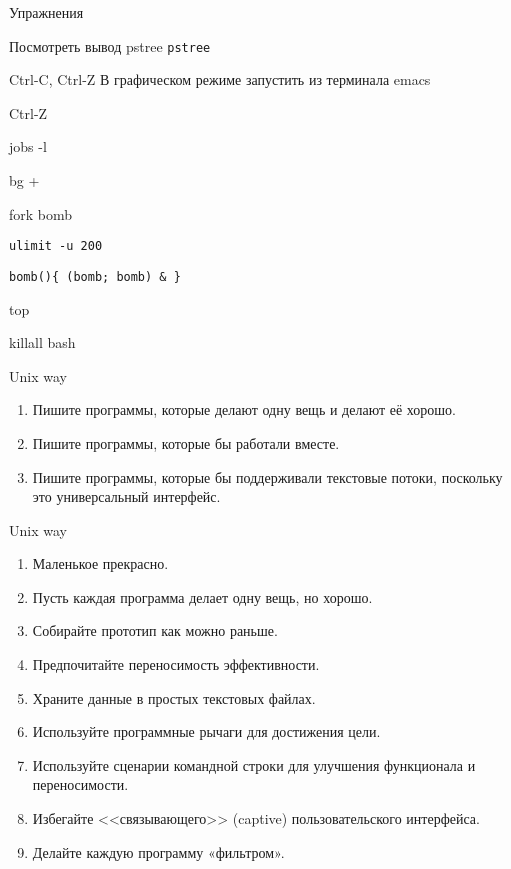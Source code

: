 \begin{frame}{Упражнения}
  \begin{block}{Посмотреть вывод pstree}
    {\tt pstree}
  \end{block}
  \pause
  \begin{block}{Ctrl-C, Ctrl-Z}
    В графическом режиме запустить из терминала emacs

    Ctrl-Z

    jobs -l

    bg +
  \end{block}
  \pause
  \begin{block}{fork bomb}

    {\tt ulimit -u 200} 

    {\tt bomb()\{ (bomb; bomb) \& \} }

    top

    killall bash

  \end{block}
\end{frame}


\begin{frame}{Unix way}
  \begin{enumerate}
    \item Пишите программы, которые делают одну вещь и делают её хорошо.
    \item Пишите программы, которые бы работали вместе.
    \item Пишите программы, которые бы поддерживали текстовые потоки, поскольку это универсальный интерфейс. 
  \end{enumerate}
\end{frame}

\begin{frame}{Unix way}
  \begin{enumerate}
    \item   Маленькое прекрасно.
    \item   Пусть каждая программа делает одну вещь, но хорошо.
    \item   Собирайте прототип как можно раньше.
    \item   Предпочитайте переносимость эффективности.
    \item   Храните данные в простых текстовых файлах.
    \item   Используйте программные рычаги для достижения цели.
    \item   Используйте сценарии командной строки для улучшения функционала и переносимости.
    \item   Избегайте <<связывающего>> (captive) пользовательского интерфейса.
    \item   Делайте каждую программу «фильтром».
  \end{enumerate}
\end{frame}

